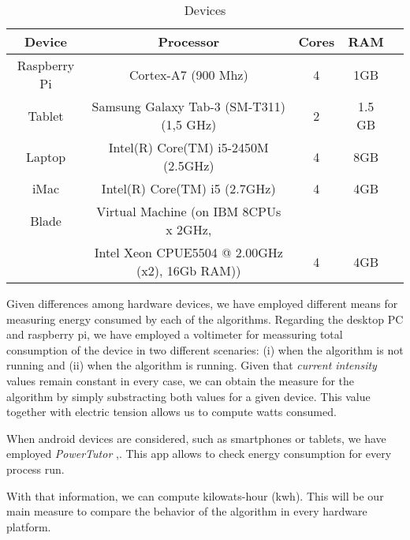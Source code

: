  
\begin{table}
\renewcommand{\arraystretch}{1.3}
\centering
\caption{Devices}
\label{Table:devices}
\begin{tabular}{ccccc} \hline
Device		&	Processor			&	Cores	&	RAM \\ \hline
Raspberry Pi	& Cortex-A7 (900 Mhz)	& 4 			&	1GB \\
Tablet		& Samsung Galaxy Tab-3 (SM-T311) (1,5 GHz)& 2  & 1.5 GB \\
Laptop 		& Intel(R) Core(TM) i5-2450M (2.5GHz)	&	4	&	8GB\\
iMac			& Intel(R) Core(TM) i5  (2.7GHz)	& 4	& 4GB \\
Blade		& Virtual Machine (on IBM 8CPUs x 2GHz, \\
&Intel Xeon CPUE5504 @ 2.00GHz (x2), 16Gb RAM)) & 4 & 4GB \\
\hline
\end{tabular}
\end{table}

Given differences among hardware devices, we have employed different means  %
for measuring energy consumed by each of the algorithms.  Regarding the desktop PC and raspberry pi, we have employed a voltimeter for meassuring total consumption of the device in two different scenaries:  (i) when the algorithm is not running and (ii) when the algorithm is running.  Given that \textit{current intensity} values remain constant in every case, we can obtain the measure for the algorithm by simply substracting both values for a given device.  This value together with electric tension allows us to compute watts consumed.

When android devices are considered, such as smartphones or tablets, we have employed  \textit{PowerTutor} \cite{powertutor},\cite{powertutor2}. This app allows to check energy consumption for every process run.

With that information, we can compute kilowats-hour (kwh).  This will be our main measure to compare the behavior of the algorithm in every hardware platform.



